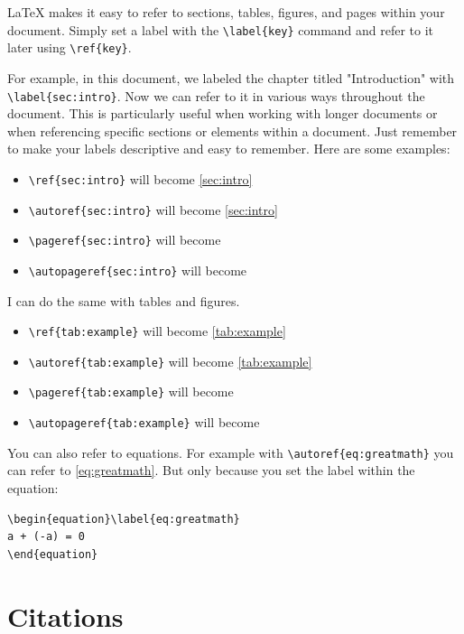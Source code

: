 \documentclass[12pt,final,a4paper,oneside]{book}
\begin{document}
\LaTeX{} makes it easy to refer to sections, tables, figures, and pages within your document. Simply set a label with the \verb*|\label{key}| command and refer to it later using \verb*|\ref{key}|.
	
For example, in this document, we labeled the chapter titled "Introduction" with \verb*|\label{sec:intro}|. Now we can refer to it in various ways throughout the document. This is particularly useful when working with longer documents or when referencing specific sections or elements within a document. Just remember to make your labels descriptive and easy to remember. Here are some examples:
	
\begin{itemize}
	\item \verb*|\ref{sec:intro}| will become \ref{sec:intro}	
	\item \verb*|\autoref{sec:intro}| will become \autoref{sec:intro}	
	\item \verb*|\pageref{sec:intro}| will become \pageref{sec:intro}
	\item \verb*|| will become \autopageref{sec:intro}
\end{itemize} 
	
I can do the same with tables and figures. 
	
\begin{itemize}
	\item \verb*|\ref{tab:example}| will become \ref{tab:example}	
	\item \verb*|\autoref{tab:example}| will become \autoref{tab:example}	
	\item \verb*|\pageref{tab:example}| will become \pageref{tab:example}
	\item \verb*|| will become \autopageref{tab:example}
\end{itemize} 

You can also refer to equations. For example with \verb|\autoref{eq:greatmath}| you can refer to \autoref{eq:greatmath}. But only because you set the label within the equation:
\begin{verbatim}
\begin{equation}\label{eq:greatmath}
a + (-a) = 0
\end{equation}
\end{verbatim}
	
\section{Citations}
\end{document}

